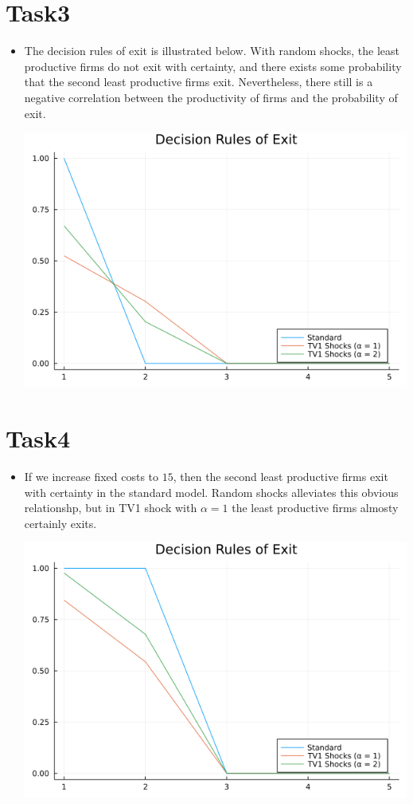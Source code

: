 \documentclass[11pt]{article} %
\begin{document}
\section*{Task3}
\begin{itemize}
	\item[] The decision rules of exit is illustrated below. With random shocks, the least productive firms do not exit with certainty, and there exists some probability that the second least productive firms exit. Nevertheless, there still is a negative correlation between the productivity of firms and the probability of exit.
	
	\begin{center}
	\includegraphics[width=.8\linewidth]{./exit_func1.png}
	\end{center}	
\end{itemize}
	\pagebreak
	
\section*{Task4}
\begin{itemize}
	\item[] If we increase fixed costs to $15$, then the second least productive firms exit with certainty in the standard model. Random shocks alleviates this obvious relationshp, but in TV1 shock with $\alpha=1$ the least productive firms almosty certainly exits.
	
	\begin{center}
		\includegraphics[width=.8\linewidth]{./exit_func2.png}
	\end{center}
	
\end{itemize}
	
\end{document}
